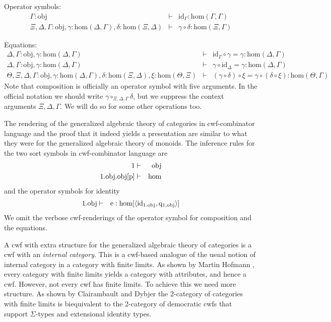 \documentclass{lmcs}
\newcommand{\FYI}[1]{{\color{red}#1}}
\def\Obj{\mathrm{obj}}
\def\Ctx{\mathrm{Ctx}}
\def\Hom{\mathrm{hom}}
\def\id{\mathrm{id}}
\def\idmon{\mathrm{e}}
\begin{document}
Operator symbols:
\begin{eqnarray*}
\Gamma : \Obj &\vdash& \id_\Gamma : \Hom(\Gamma,\Gamma)\\
\Xi,\Delta,\Gamma : \Obj, \gamma : \Hom(\Delta,\Gamma), \delta : \Hom(\Xi,\Delta) &\vdash&
\gamma \circ \delta : \Hom(\Xi,\Gamma)
\end{eqnarray*}

Equations:
\begin{eqnarray*}
\Delta, \Gamma : \Obj, \gamma : \Hom(\Delta,\Gamma) &\vdash& \id_\Gamma \circ \gamma = \gamma : \Hom(\Delta,\Gamma)\\
\Delta, \Gamma : \Obj, \gamma : \Hom(\Delta,\Gamma) &\vdash& \gamma \circ \id_\Delta = \gamma : \Hom(\Delta,\Gamma)\\
\Theta, \Xi,\Delta,\Gamma : \Obj, \gamma : \Hom(\Delta,\Gamma), \delta : \Hom(\Xi,\Delta), \xi : \Hom(\Theta,\Xi) &\vdash&
(\gamma \circ \delta) \circ \xi = \gamma \circ (\delta \circ \xi): \Hom(\Theta,\Gamma)
\end{eqnarray*}
Note that composition is officially an operator symbol with five arguments. In the official notation we should write $\gamma \circ_{\Xi,\Delta,\Gamma} \delta$, but we suppress the context arguments $\Xi,\Delta,\Gamma$. We will do so for some other operations too.

The rendering of the generalized algebraic theory of categories in cwf-combinator language and the proof that it indeed yields a \FYI{presentation} are similar to what they were for the generalized algebraic theory of monoids. The inference rules for the two sort symbols in cwf-combinator language are
\begin{eqnarray*}
1 &\vdash& \Obj\\
1.\Obj.\Obj[\p] &\vdash& \Hom
\end{eqnarray*}
and the operator symbols for identity
\begin{eqnarray*}
1.\Obj &\vdash& \idmon : \Hom[\tuple{\id_{1.\Obj},\q_{1,\Obj}}]
\end{eqnarray*}
We omit the verbose cwf-renderings of the operator symbol for composition and the equations.

A cwf with extra structure for the generalized algebraic theory of categories is a cwf with an {\em internal category}. This is a cwf-based analogue of the usual notion of internal category in a category with finite limits. As shown by Martin Hofmann \cite{hofmann:csl,hofmann:cambridge}, every category with finite limits yields a category with attributes, and hence a cwf. However, not every cwf has finite limits. To achieve this we need more structure. As shown by Clairambault and Dybjer \cite{ClairambaultD11,ClairambaultD14} the 2-category of categories with finite limits is biequivalent to the 2-category of democratic cwfs that support $\Sigma$-types and extensional identity types.
\end{document}
